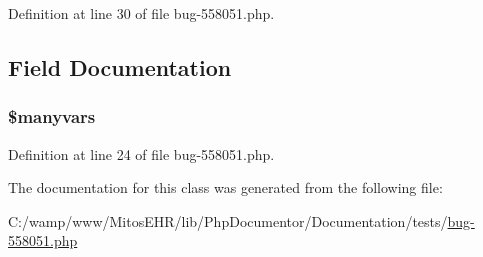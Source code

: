 \-Definition at line 30 of file bug-\/558051.\-php.


\begin{DoxyCode}
        {
        }
\end{DoxyCode}


\subsection{\-Field \-Documentation}
\hypertarget{classmultipl_ab62ae7acb36701e4c46fb388857627a1}{
\subsubsection[{\$manyvars}]{\setlength{\rightskip}{0pt plus 5cm}\$manyvars}}\label{classmultipl_ab62ae7acb36701e4c46fb388857627a1}


\-Definition at line 24 of file bug-\/558051.\-php.



\-The documentation for this class was generated from the following file\-:\begin{DoxyCompactItemize}
\item 
\-C\-:/wamp/www/\-Mitos\-E\-H\-R/lib/\-Php\-Documentor/\-Documentation/tests/\hyperlink{bug-558051_8php}{bug-\/558051.\-php}\end{DoxyCompactItemize}
